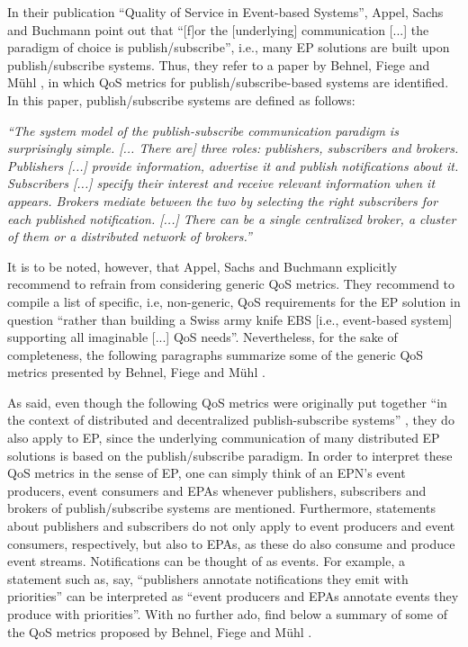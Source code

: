 \documentclass[article, 10pt, type=bsc, colorback, accentcolor=tud8b, parskip=half, bibliography=totocnumbered]{tudthesis}
\begin{document}
In their publication ``Quality of Service in Event-based Systems'', Appel, Sachs and Buchmann \cite{quality} point out that ``[f]or the [underlying] communication [...] the paradigm of choice is publish/subscribe'', i.e., many EP solutions are built upon publish/subscribe systems.
Thus, they refer to a paper by Behnel, Fiege and Mühl \cite{1648910}, in which QoS metrics for publish/subscribe-based systems are identified.
In this paper, publish/subscribe systems are defined as follows:

\emph{
``The system model of the publish-subscribe communication paradigm is surprisingly simple.
[... There are] three roles: publishers, subscribers and brokers.
Publishers [...] provide information, advertise it and publish notifications about it.
Subscribers [...] specify their interest and receive relevant information when it appears.
Brokers mediate between the two by selecting the right subscribers for each published notification. [...]
There can be a single centralized broker, a cluster of them or a distributed network of brokers.''}

It is to be noted, however, that Appel, Sachs and Buchmann \cite{quality} explicitly recommend to refrain from considering  generic QoS metrics.
They recommend to compile a list of specific, i.e, non-generic, QoS requirements for the EP solution in question ``rather than building a Swiss army knife EBS [i.e., event-based system] supporting all imaginable [...] QoS needs''.
Nevertheless, for the sake of completeness, the following paragraphs summarize some of the generic QoS metrics presented by Behnel, Fiege and Mühl \cite{1648910}. 

As said, even though the following QoS metrics were originally put together ``in the context of distributed and decentralized publish-subscribe systems'' \cite{1648910}, they do also apply to EP, since the underlying communication of many distributed EP solutions is based on the publish/subscribe paradigm.
In order to interpret these QoS metrics in the sense of EP, one can simply think of an EPN's event producers, event consumers and EPAs whenever publishers, subscribers and brokers of publish/subscribe systems are mentioned.
Furthermore, statements about publishers and subscribers do not only apply to event producers and event consumers, respectively, but also to EPAs, as these do also consume and produce event streams.
Notifications can be thought of as events.
For example, a statement such as, say, ``publishers annotate notifications they emit with priorities'' can be interpreted as ``event producers and EPAs annotate events they produce with priorities''. With no further ado, find below a summary of some of the QoS metrics proposed by Behnel, Fiege and Mühl \cite{1648910}.
\end{document}
